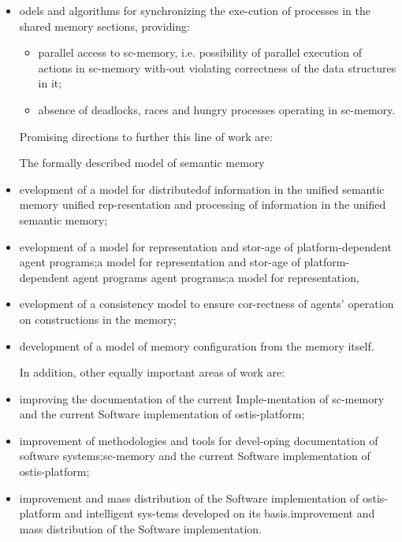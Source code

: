 \documentclass[10pt, a4paper]{article}
\begin{document}
\begin{multicols}{2}
\begin{itemize}
\item odels and algorithms for synchronizing the exe-cution of processes in the shared memory sections,
providing:
\begin{itemize}[leftmargin=*]
    \item  parallel access to sc-memory, i.e. possibility of
parallel execution of actions in sc-memory with-out violating correctness of the data structures in
it;

   \item absence of deadlocks, races and hungry processes
operating in sc-memory.\setlength{\parskip}{0pt}
\setlength{\itemsep}{0pt}
\end{itemize}


Promising directions to further this line of work are:


The formally described model of semantic memory
\item evelopment of a model for distributedof information in the unified semantic memory unified  rep-resentation and processing of information in the unified semantic memory;

\item evelopment of a model for representation and stor-age of platform-dependent agent programs;a model for representation and stor-age of platform-dependent agent programs  agent programs;a model for representation,

\item evelopment of a consistency model to ensure cor-rectness of agents’ operation on constructions in the memory;

\item  development of a model of memory configuration
from the memory itself.

In addition, other equally important areas of work are:

\item improving the documentation of the current Imple-mentation of sc-memory and the current Software implementation of ostis-platform;

\item  improvement of methodologies and tools for devel-oping documentation of software systems;sc-memory and the current Software implementation of ostis-platform;

\item  improvement and mass distribution of the Software
implementation of ostis-platform and intelligent sys-tems developed on its basis.improvement and mass distribution of the Software
implementation.



\end{itemize}
\end{multicols}
\end{document}
